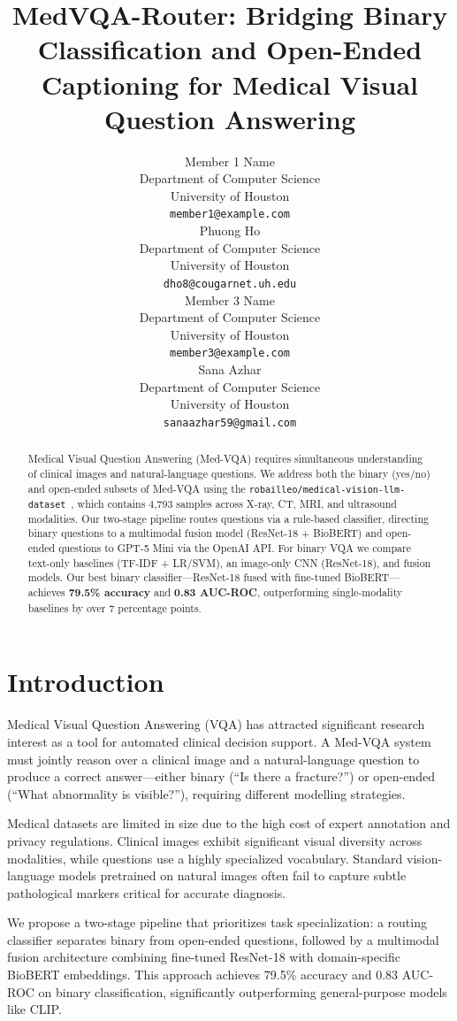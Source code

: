 \documentclass{article}
\title{MedVQA-Router: Bridging Binary Classification and Open-Ended Captioning for Medical Visual Question Answering}
\author{%
  Member 1 Name \\
  Department of Computer Science \\
  University of Houston \\
  \texttt{member1@example.com} \\
  \And
  Phuong Ho \\
  Department of Computer Science \\
  University of Houston \\
  \texttt{dho8@cougarnet.uh.edu} \\
  \And
  Member 3 Name \\
  Department of Computer Science \\
  University of Houston \\
  \texttt{member3@example.com} \\
  \And
  Sana Azhar \\
  Department of Computer Science \\
  University of Houston \\
  \texttt{sanaazhar59@gmail.com} \\
}
\begin{document}
\maketitle

\begin{abstract}
Medical Visual Question Answering (Med-VQA) requires simultaneous understanding
of clinical images and natural-language questions. We address both the binary
(yes/no) and open-ended subsets of Med-VQA using the
\texttt{robailleo/medical-vision-llm-dataset}~\cite{robailleo2024}, which
contains 4,793 samples across X-ray, CT, MRI, and ultrasound modalities. Our
two-stage pipeline routes questions via a rule-based classifier, directing
binary questions to a multimodal fusion model (ResNet-18 + BioBERT) and
open-ended questions to GPT-5 Mini via the OpenAI API. For binary VQA we
compare text-only baselines (TF-IDF + LR/SVM), an image-only CNN (ResNet-18),
and fusion models. Our best binary classifier---ResNet-18 fused with fine-tuned
BioBERT---achieves \textbf{79.5\% accuracy} and \textbf{0.83 AUC-ROC},
outperforming single-modality baselines by over 7 percentage points.
\end{abstract}


\section{Introduction}

Medical Visual Question Answering (VQA) has attracted significant research
interest as a tool for automated clinical decision support. A Med-VQA system
must jointly reason over a clinical image and a natural-language question to
produce a correct answer---either binary (``Is there a fracture?'') or
open-ended (``What abnormality is visible?''), requiring different modelling
strategies.

Medical datasets are limited in size due to the high cost of expert annotation
and privacy regulations. Clinical images exhibit significant visual diversity
across modalities, while questions use a highly specialized vocabulary. Standard
vision-language models pretrained on natural images often fail to capture subtle
pathological markers critical for accurate diagnosis.

We propose a two-stage pipeline that prioritizes task specialization: a routing
classifier separates binary from open-ended questions, followed by a multimodal
fusion architecture combining fine-tuned ResNet-18 with domain-specific BioBERT
embeddings. This approach achieves 79.5\% accuracy and 0.83 AUC-ROC on binary
classification, significantly outperforming general-purpose models like CLIP.
\end{document}
